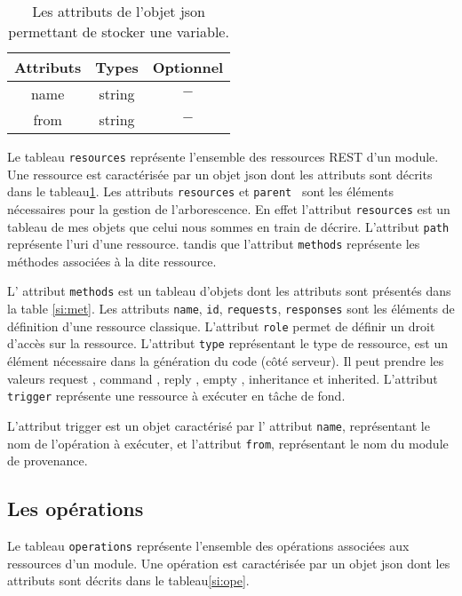 \documentclass[a4paper,11pt]{report}
\begin{document}
\begin{table}[ht]
 \begin{tabular}{|c|c|c|}
   \hline
   Attributs & Types & Optionnel \\
   \hline
   name  & string &  $-$ \\
   \hline
   from  & string &  $-$ \\
    \hline
  \end{tabular}
 \caption{Les attributs de l'objet  json permettant de stocker une variable. \label{si:res} }
\end{table} 
 
Le tableau {\tt resources} représente l'ensemble des ressources REST d'un module. Une ressource est 
caractérisée par un objet json dont les attributs sont décrits dans le  tableau\ref{si:res}. Les attributs 
{\tt resources} et {\tt parent } sont les éléments nécessaires pour la gestion de l'arborescence. En effet l'attribut
{\tt resources} est un tableau de mes objets que celui nous sommes en train de décrire. L'attribut {\tt path} représente l'uri d'une ressource. tandis que l'attribut {\tt methods}
représente les méthodes associées à la dite ressource.

L' attribut  {\tt methods} est un tableau d'objets dont les attributs sont présentés dans la table \ref{si:met}.
 Les attributs {\tt name}, {\tt id},  {\tt requests}, {\tt responses} sont les éléments de définition d'une ressource 
 classique. L'attribut {\tt role} permet de définir un droit d'accès sur la ressource. L'attribut {\tt type} représentant
 le type de ressource, est un élément nécessaire dans la génération du code (côté serveur). Il peut prendre les valeurs
 \og request \fg, \og command \fg, \og reply \fg, \og empty \fg, \og inheritance \fg et  \og inherited\fg. L'attribut {\tt trigger}
 représente une ressource à exécuter en tâche de fond.
 
L'attribut trigger est un objet caractérisé par l' attribut {\tt name}, représentant le 
nom de l'opération à exécuter, et l'attribut {\tt from}, représentant le nom du module de provenance.

\subsection{Les opérations}



Le tableau {\tt operations} représente l'ensemble des opérations associées aux ressources d'un module.
Une opération est caractérisée par un objet json dont les attributs sont décrits dans le  tableau\ref{si:ope}.
\end{document}
